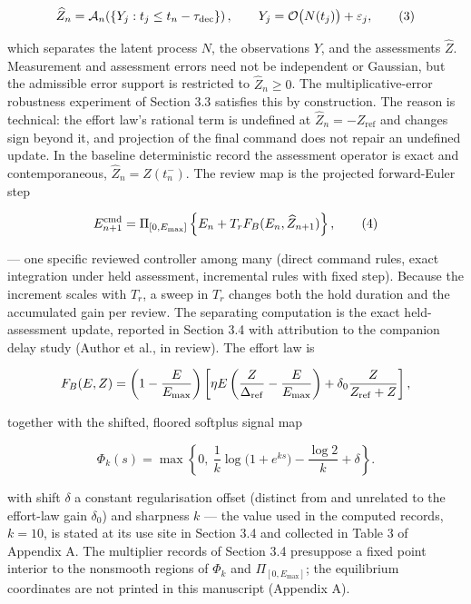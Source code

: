 \documentclass[11pt]{article}
\begin{document}
\[
\widehat Z_n=\mathcal A_n\!\left(\{Y_j:t_j\le t_n-\tau_{\rm dec}\}\right),\qquad
Y_j=\mathcal O\bigl(N(t_j)\bigr)+\varepsilon_j,
\tag{3}
\]

which separates the latent process \(N\), the observations \(Y\), and
the assessments \(\widehat Z\). Measurement and assessment errors need
not be independent or Gaussian, but the admissible error support is
restricted to \(\widehat Z_n \ge 0\). The multiplicative-error
robustness experiment of Section 3.3 satisfies this by construction. The
reason is technical: the effort law's rational term is undefined at
\(\widehat Z_n = -Z_{\mathrm{ref}}\) and changes sign beyond it, and
projection of the final command does not repair an undefined update. In
the baseline deterministic record the assessment operator is exact and
contemporaneous, \(\widehat Z_n = Z(t_n^-)\). The review map is the
projected forward-Euler step

\[
E^{\rm cmd}_{n+1}=\Pi_{[0,E_{\max}]}\left\{E_n+T_rF_B(E_n,\widehat Z_{n+1})\right\},
\tag{4}
\]

--- one specific reviewed controller among many (direct command rules,
exact integration under held assessment, incremental rules with fixed
step). Because the increment scales with \(T_r\), a sweep in \(T_r\)
changes both the hold duration and the accumulated gain per review. The
separating computation is the exact held-assessment update, reported in
Section 3.4 with attribution to the companion delay study (Author et
al., in review). The effort law is

\[
F_B(E,Z)=\left(1-\frac{E}{E_{\max}}\right)
\left[
\eta E\left(\frac{Z}{\Delta_{\rm ref}}-\frac{E}{E_{\max}}\right)
+\delta_0\frac{Z}{Z_{\rm ref}+Z}
\right],
\]

together with the shifted, floored softplus signal map

\[
\Phi_k(s)=\max\left\{0,\ \frac{1}{k}\log\!\bigl(1+e^{ks}\bigr)-\frac{\log 2}{k}+\delta\right\}.
\]

with shift \(\delta\) a constant regularisation offset (distinct from
and unrelated to the effort-law gain \(\delta_0\)) and sharpness \(k\)
--- the value used in the computed records, \(k = 10\), is stated at its
use site in Section 3.4 and collected in Table 3 of Appendix A. The
multiplier records of Section 3.4 presuppose a fixed point interior to
the nonsmooth regions of \(\Phi_k\) and \(\Pi_{[0,E_{\max}]}\); the
equilibrium coordinates are not printed in this manuscript (Appendix A).
\end{document}
